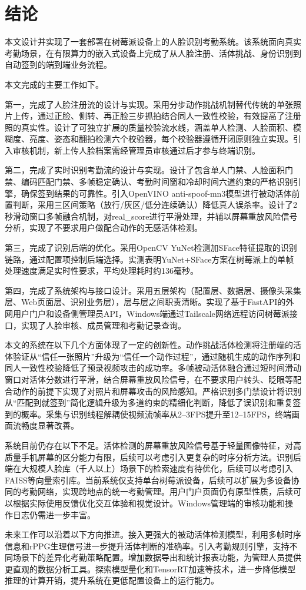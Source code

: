 \section*{\centering{}结\quad 论}

本文设计并实现了一套部署在树莓派设备上的人脸识别考勤系统。该系统面向真实考勤场景，在有限算力的嵌入式设备上完成了从人脸注册、活体挑战、身份识别到自动签到的端到端业务流程。

本文完成的主要工作如下。

第一，完成了人脸注册流的设计与实现。采用分步动作挑战机制替代传统的单张照片上传，通过正脸、侧转、再正脸三步抓拍结合同人一致性校验，有效提高了注册照的真实性。设计了可独立扩展的质量校验流水线，涵盖单人检测、人脸面积、模糊度、亮度、姿态和翻拍检测六个校验器，每个校验器遵循开闭原则独立实现。引入审核机制，新上传人脸档案需经管理员审核通过后才参与终端识别。

第二，完成了实时识别考勤流的设计与实现。设计了包含单人门禁、人脸面积门禁、编码匹配门禁、多帧稳定确认、考勤时间窗和冷却时间六道约束的严格识别引擎，确保签到结果的可靠性。引入OpenVINO anti-spoof-mn3模型进行被动活体前置判断，采用三区间策略（放行/灰区/低分连续确认）降低真人误杀率。设计了2秒滑动窗口多帧融合机制，对real\_score进行平滑处理，并辅以屏幕重放风险信号分析，实现了不要求用户做配合动作的无感活体检测。

第三，完成了识别后端的优化。采用OpenCV YuNet检测加SFace特征提取的识别链路，通过配置项控制后端选择。实测表明YuNet+SFace方案在树莓派上的单帧处理速度满足实时性要求，平均处理耗时约136毫秒。

第四，完成了系统架构与接口设计。采用五层架构（配置层、数据层、摄像头采集层、Web页面层、识别业务层），层与层之间职责清晰。实现了基于FastAPI的外网用户门户和设备侧管理员API，Windows端通过Tailscale网络远程访问树莓派接口，实现了人脸审核、成员管理和考勤记录查询。

本文的系统在以下几个方面体现了一定的创新性。动作挑战活体检测将注册端的活体验证从``信任一张照片''升级为``信任一个动作过程''，通过随机生成的动作序列和同人一致性校验降低了预录视频攻击的成功率。多帧被动活体融合通过短时间滑动窗口对活体分数进行平滑，结合屏幕重放风险信号，在不要求用户转头、眨眼等配合动作的前提下实现了对照片和屏幕攻击的风险感知。严格识别多门禁设计将识别从``匹配到就签到''简化逻辑升级为多道约束的精细化判断，降低了误识别和重复签到的概率。采集与识别线程解耦使视频流帧率从2--3FPS提升至12--15FPS，终端画面流畅度显著改善。

系统目前仍存在以下不足。活体检测的屏幕重放风险信号基于轻量图像特征，对高质量手机屏幕的区分能力有限，后续可以考虑引入更复杂的时序分析方法。识别后端在大规模人脸库（千人以上）场景下的检索速度有待优化，后续可以考虑引入FAISS等向量索引库。当前系统仅支持单台树莓派设备，后续可以扩展为多设备协同的考勤网络，实现跨地点的统一考勤管理。用户门户页面仍有原型性质，后续可以根据实际使用反馈优化交互体验和视觉设计。Windows管理端的审核功能和操作日志仍需进一步丰富。

未来工作可以沿着以下方向推进。接入更强大的被动活体检测模型，利用多帧时序信息和rPPG生理信号进一步提升活体判断的准确率。引入考勤规则引擎，支持不同场景下的差异化考勤策略配置。增加数据导出和统计报表功能，为管理人员提供更直观的数据分析工具。探索模型量化和TensorRT加速等技术，进一步降低模型推理的计算开销，提升系统在更低配置设备上的运行能力。
